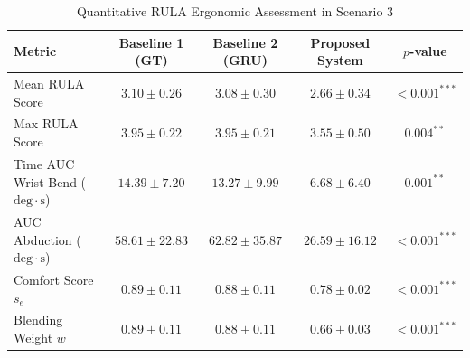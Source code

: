 \begin{table}[htbp]
\centering
\caption{Quantitative RULA Ergonomic Assessment in Scenario 3}
\label{tab:scenario3_rula}
\begin{tabular}{lcccc}
\toprule
\textbf{Metric} & \textbf{Baseline 1 (GT)} & \textbf{Baseline 2 (GRU)} & \textbf{Proposed System} & \textbf{$p$-value} \\
\midrule
Mean RULA Score & $3.10 \pm 0.26$ & $3.08 \pm 0.30$ & $\mathbf{2.66 \pm 0.34}$ & $< 0.001^{***}$ \\
Max RULA Score & $3.95 \pm 0.22$ & $3.95 \pm 0.21$ & $\mathbf{3.55 \pm 0.50}$ & $0.004^{**}$ \\
Time %
AUC Wrist Bend ($\mathrm{deg}\cdot\mathrm{s}$) & $14.39 \pm 7.20$ & $13.27 \pm 9.99$ & $\mathbf{6.68 \pm 6.40}$ & $0.001^{**}$ \\
AUC Abduction ($\mathrm{deg}\cdot\mathrm{s}$) & $58.61 \pm 22.83$ & $62.82 \pm 35.87$ & $\mathbf{26.59 \pm 16.12}$ & $< 0.001^{***}$ \\
Comfort Score $s_e$ & $0.89 \pm 0.11$ & $0.88 \pm 0.11$ & $\mathbf{0.78 \pm 0.02}$ & $< 0.001^{***}$ \\
Blending Weight $w$ & $0.89 \pm 0.11$ & $0.88 \pm 0.11$ & $\mathbf{0.66 \pm 0.03}$ & $< 0.001^{***}$ \\
\bottomrule
\end{tabular}
\end{table}